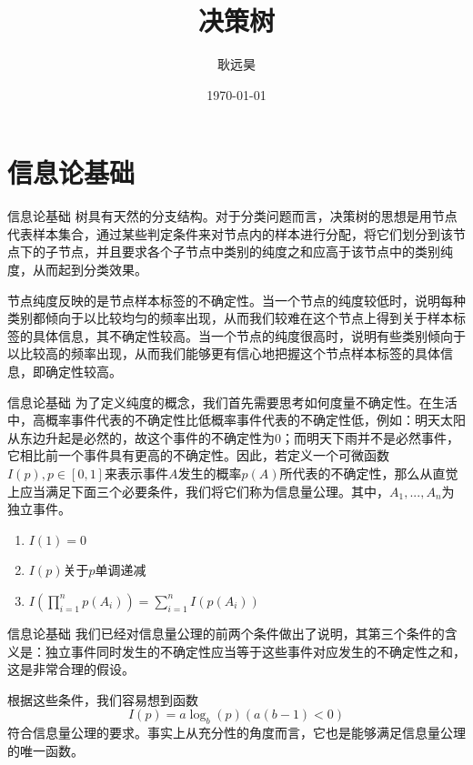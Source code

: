 \documentclass{ctexbeamer}        %
\begin{document}
\title{决策树}
\author{耿远昊}
\date{\today}
\frame{\titlepage}




\section{信息论基础}

\begin{frame}{信息论基础}
树具有天然的分支结构。对于分类问题而言，决策树的思想是用节点代表样本集合，通过某些判定条件来对节点内的样本进行分配，将它们划分到该节点下的子节点，并且要求各个子节点中类别的纯度之和应高于该节点中的类别纯度，从而起到分类效果。
\newline

节点纯度反映的是节点样本标签的不确定性。当一个节点的纯度较低时，说明每种类别都倾向于以比较均匀的频率出现，从而我们较难在这个节点上得到关于样本标签的具体信息，其不确定性较高。当一个节点的纯度很高时，说明有些类别倾向于以比较高的频率出现，从而我们能够更有信心地把握这个节点样本标签的具体信息，即确定性较高。
\end{frame}

\begin{frame}{信息论基础}
为了定义纯度的概念，我们首先需要思考如何度量不确定性。在生活中，高概率事件代表的不确定性比低概率事件代表的不确定性低，例如：明天太阳从东边升起是必然的，故这个事件的不确定性为0；而明天下雨并不是必然事件，它相比前一个事件具有更高的不确定性。因此，若定义一个可微函数$I(p),p\in [0, 1]$来表示事件$A$发生的概率$p(A)$所代表的不确定性，那么从直觉上应当满足下面三个必要条件，我们将它们称为信息量公理。其中，$A_1,...,A_n$为独立事件。

\begin{enumerate}
\item $I(1)=0$
\item $I(p)$关于$p$单调递减
\item $I(\prod_{i=1}^np(A_i))=\sum_{i=1}^nI(p(A_i))$
\end{enumerate}
\end{frame}

\begin{frame}{信息论基础}
我们已经对信息量公理的前两个条件做出了说明，其第三个条件的含义是：独立事件同时发生的不确定性应当等于这些事件对应发生的不确定性之和，这是非常合理的假设。
\newline

根据这些条件，我们容易想到函数
$$
I(p)=a\log_{b}(p)(a(b-1)<0)
$$
符合信息量公理的要求。事实上从充分性的角度而言，它也是能够满足信息量公理的唯一函数。
\end{frame}
\end{document}
